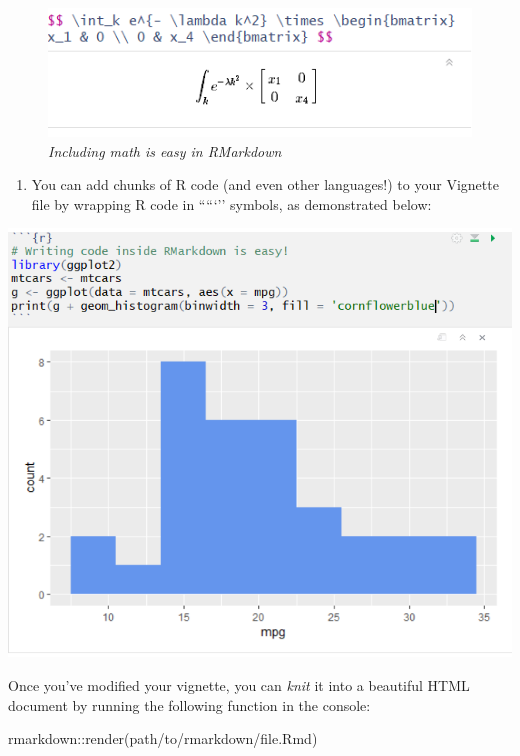 \documentclass[
]{book}
\newenvironment{Shaded}{\begin{snugshade}}{\end{snugshade}}
\newcommand{\FunctionTok}[1]{\textcolor[rgb]{0.00,0.00,0.00}{#1}}
\newcommand{\NormalTok}[1]{#1}
\newcommand{\SpecialCharTok}[1]{\textcolor[rgb]{0.00,0.00,0.00}{#1}}
\newcommand{\StringTok}[1]{\textcolor[rgb]{0.31,0.60,0.02}{#1}}
\providecommand{\tightlist}{%
  \setlength{\itemsep}{0pt}\setlength{\parskip}{0pt}}
\begin{document}
\begin{figure}
\centering
\includegraphics{images/packageSS/vignettemath.PNG}
\caption{\emph{Including math is easy in RMarkdown}}
\end{figure}

\begin{enumerate}
\def\labelenumi{\arabic{enumi}.}
\setcounter{enumi}{2}
\tightlist
\item
  You can add chunks of R code (and even other languages!) to your Vignette file by wrapping R code in `````'' symbols, as demonstrated below:
\end{enumerate}

\includegraphics{images/packageSS/vignettecode.PNG}

Once you've modified your vignette, you can \emph{knit} it into a beautiful HTML document by running the following function in the console:

\begin{Shaded}
\begin{Highlighting}[]
\NormalTok{rmarkdown}\SpecialCharTok{::}\FunctionTok{render}\NormalTok{(}\StringTok{\textquotesingle{}path/to/rmarkdown/file.Rmd\textquotesingle{}}\NormalTok{)}
\end{Highlighting}
\end{Shaded}
\end{document}
